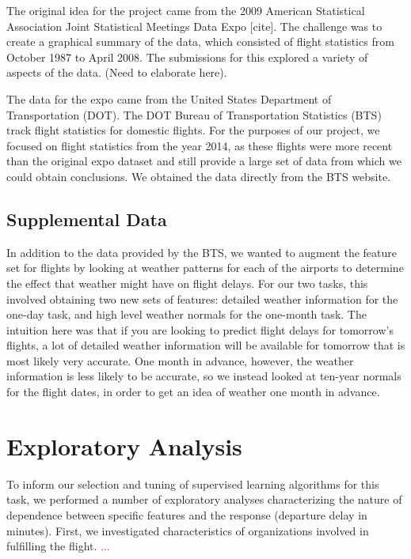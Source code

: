 \documentclass{article}
\begin{document}
The original idea for the project came from the 2009 American Statistical Association Joint Statistical Meetings Data Expo [cite]. The challenge was to create a graphical summary of the data, which consisted of flight statistics from October 1987 to April 2008. The submissions for this explored a variety of aspects of the data. (Need to elaborate here).

The data for the expo came from the United States Department of Transportation (DOT). The DOT Bureau of Transportation Statistics (BTS) track flight statistics for domestic flights. For the purposes of our project, we focused on flight statistics from the year 2014, as these flights were more recent than the original expo dataset and still provide a large set of data from which we could obtain conclusions. We obtained the data directly from the BTS website.  

\subsection{Supplemental Data}

In addition to the data provided by the BTS, we wanted to augment the feature set for flights by looking at weather patterns for each of the airports to determine the effect that weather might have on flight delays. For our two tasks, this involved obtaining two new sets of features: detailed weather information for the one-day task, and high level weather normals for the one-month task. The intuition here was that if you are looking to predict flight delays for tomorrow's flights, a lot of detailed weather information will be available for tomorrow that is most likely very accurate. One month in advance, however, the weather information is less likely to be accurate, so we instead looked at ten-year normals for the flight dates, in order to get an idea of weather one month in advance.


\section{Exploratory Analysis}

To inform our selection and tuning of supervised learning algorithms for this task, we performed a number of exploratory analyses characterizing the nature of dependence between specific features and the response (departure delay in minutes). First, we investigated characteristics of organizations involved in fulfilling the flight. \textcolor{red}{...}
\end{document}
